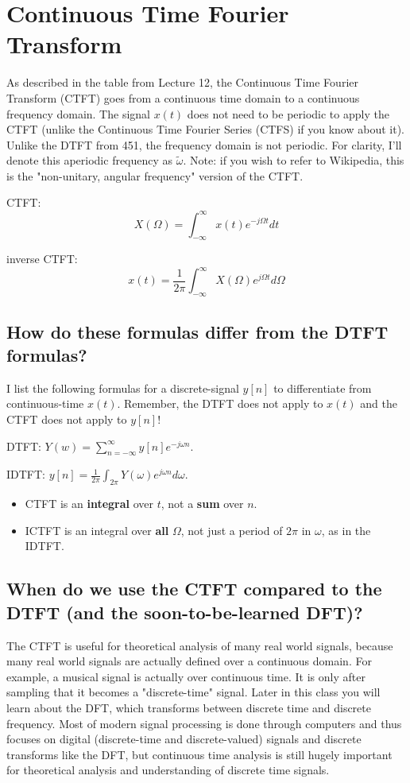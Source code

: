 \documentclass[11pt]{article}
\begin{document}
\section{Continuous Time Fourier Transform}
As described in the table from Lecture 12, the Continuous Time Fourier Transform (CTFT) goes from a continuous time domain to a continuous frequency domain. The signal $x(t)$ does not need to be periodic to apply the CTFT (unlike the Continuous Time Fourier Series (CTFS) if you know about it). Unlike the DTFT from 451, the frequency domain is not periodic. For clarity, I'll denote this aperiodic frequency as $\tilde{\omega}$. Note: if you wish to refer to Wikipedia, this is the "non-unitary, angular frequency" version of the CTFT.

CTFT:
\[ X(\Omega) = \int_{-\infty}^\infty x(t) e^{-j \Omega t} dt
\]

inverse CTFT:
\[ x(t) = \frac{1}{2 \pi} \int_{-\infty}^\infty X(\Omega)e^{j \Omega t} d\Omega
\]

\subsection*{How do these formulas differ from the DTFT formulas? }
I list the following formulas for a discrete-signal $y[n]$ to differentiate from continuous-time $x(t)$. Remember, the DTFT does not apply to $x(t)$ and the CTFT does not apply to $y[n]$!

DTFT: $Y(w) = \sum_{n=-\infty}^\infty y[n] e^{-j \omega n}$.

IDTFT: $y[n] = \frac{1}{2 \pi} \int_{2\pi} Y(\omega)e^{j \omega n} d\omega$.
\begin{itemize}
	\item CTFT is an \textbf{integral} over $t$, not a \textbf{sum} over $n$.
	\item ICTFT is an integral over \textbf{all} $\Omega$, not just a period of $2 \pi$ in $\omega$, as in the IDTFT.
\end{itemize}

\subsection*{When do we use the CTFT compared to the DTFT (and the soon-to-be-learned DFT)?}
The CTFT is useful for theoretical analysis of many real world signals, because many real world signals are actually defined over a continuous domain. For example, a musical signal is actually over continuous time. It is only after sampling that it becomes a "discrete-time" signal. Later in this class you will learn about the DFT, which transforms between discrete time and discrete frequency. Most of modern signal processing is done through computers and thus focuses on digital (discrete-time and discrete-valued) signals and discrete transforms like the DFT, but continuous time analysis is still hugely important for theoretical analysis and  understanding of discrete time signals. 
\end{document}

